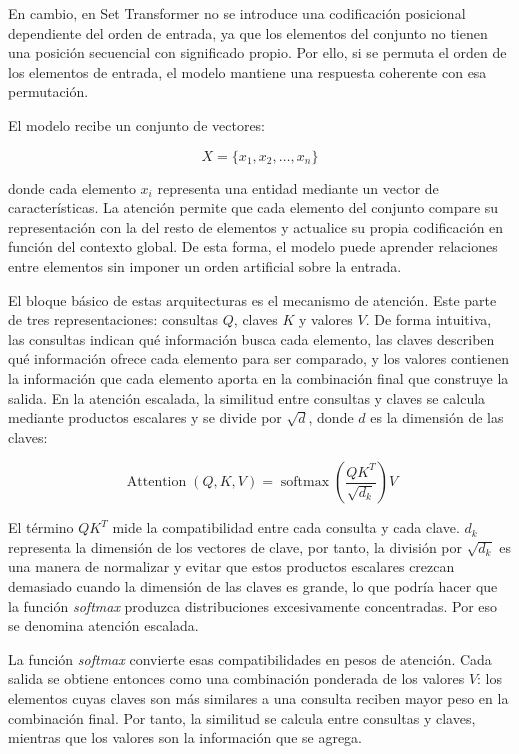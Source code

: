 En cambio, en Set Transformer no se introduce una codificación posicional dependiente del orden de entrada, ya que los elementos del conjunto no tienen una posición secuencial con significado propio. Por ello, si se permuta el orden de los elementos de entrada, el modelo mantiene una respuesta coherente con esa permutación.

El modelo recibe un conjunto de vectores:

\[
X = \{x_1, x_2, \dots, x_n\}
\]

donde cada elemento $x_i$ representa una entidad mediante un vector de características. La atención permite que cada elemento del conjunto compare su representación con la del resto de elementos y actualice su propia codificación en función del contexto global. De esta forma, el modelo puede aprender relaciones entre elementos sin imponer un orden artificial sobre la entrada.

El bloque básico de estas arquitecturas es el mecanismo de atención. Este parte de tres representaciones: consultas $Q$, claves $K$ y valores $V$. De forma intuitiva, las consultas indican qué información busca cada elemento, las claves describen qué información ofrece cada elemento para ser comparado, y los valores contienen la información que cada elemento aporta en la combinación final que construye la salida. En la atención escalada, la similitud entre consultas y claves se calcula mediante productos escalares y se divide por $\sqrt{d}$, donde $d$ es la dimensión de las claves:

\[
\operatorname{Attention}(Q,K,V) =
\operatorname{softmax}\left(\frac{QK^T}{\sqrt{d_k}}\right)V
\]

El término $QK^T$ mide la compatibilidad entre cada consulta y cada clave. $d_k$ representa la dimensión de los vectores de clave, por tanto, la división por $\sqrt{d_k}$ es una manera de normalizar y  evitar que estos productos escalares crezcan demasiado cuando la dimensión de las claves es grande, lo que podría hacer que la función \textit{softmax} produzca distribuciones excesivamente concentradas. Por eso se denomina atención escalada.

La función \textit{softmax} convierte esas compatibilidades en pesos de atención. Cada salida se obtiene entonces como una combinación ponderada de los valores $V$: los elementos cuyas claves son más similares a una consulta reciben mayor peso en la combinación final. Por tanto, la similitud se calcula entre consultas y claves, mientras que los valores son la información que se agrega.

